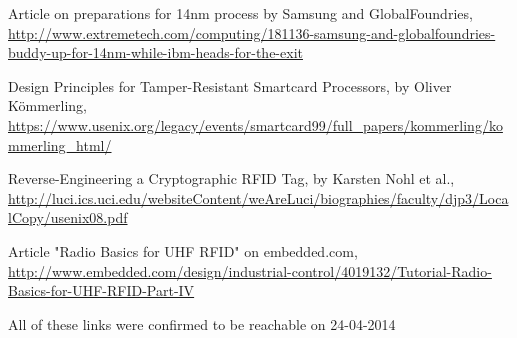 \documentclass{llncs}
\begin{document}
\begin{thebibliography}{1}
Article on preparations for 14nm process by Samsung and GlobalFoundries,
\url{http://www.extremetech.com/computing/181136-samsung-and-globalfoundries-buddy-up-for-14nm-while-ibm-heads-for-the-exit}

Design Principles for Tamper-Resistant Smartcard Processors, by Oliver Kömmerling, 
\url{https://www.usenix.org/legacy/events/smartcard99/full_papers/kommerling/kommerling_html/}

Reverse-Engineering a Cryptographic RFID Tag, by Karsten Nohl et al., 
\url{http://luci.ics.uci.edu/websiteContent/weAreLuci/biographies/faculty/djp3/LocalCopy/usenix08.pdf}

Article "Radio Basics for UHF RFID" on embedded.com,
\url{http://www.embedded.com/design/industrial-control/4019132/Tutorial-Radio-Basics-for-UHF-RFID-Part-IV}
\end{thebibliography}

All of these links were confirmed to be reachable on 24-04-2014
\end{document}
